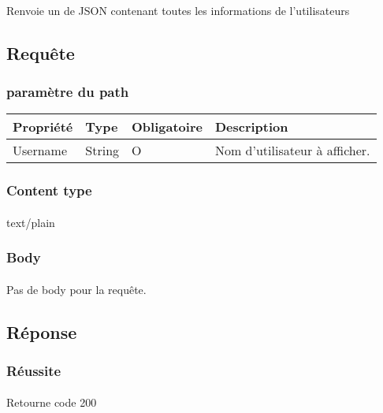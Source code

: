 \paragraph{}
	Renvoie un de JSON contenant toutes les informations de l'utilisateurs

\subsection{Requête}
	\subsubsection{paramètre du path}
		\begin{center}
			\begin{tabularx}{\textwidth}{| T{0.2122\textwidth} | S{0.22\textwidth} | S{0.15\textwidth} | S{0.3\textwidth} |}
				\hline
				Propriété & Type & Obligatoire & Description \\
				\hline
				Username & String & O & Nom d'utilisateur à afficher. \\
				\hline
			\end{tabularx}
		\end{center}
		
	\subsubsection{Content type}
		\paragraph{}
			text/plain
			
	\subsubsection{Body}
		\paragraph{}
			Pas de body pour la requête.

\newpage
\subsection{Réponse}
	\subsubsection{Réussite}
		\paragraph{}
			Retourne code 200
			
